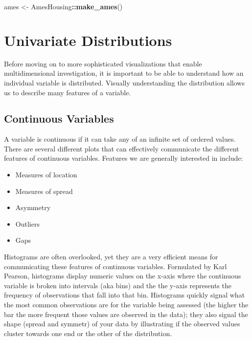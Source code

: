 \documentclass[]{article}
\newenvironment{Shaded}{\begin{snugshade}}{\end{snugshade}}
\newcommand{\KeywordTok}[1]{\textcolor[rgb]{0.13,0.29,0.53}{\textbf{#1}}}
\newcommand{\StringTok}[1]{\textcolor[rgb]{0.31,0.60,0.02}{#1}}
\newcommand{\OperatorTok}[1]{\textcolor[rgb]{0.81,0.36,0.00}{\textbf{#1}}}
\newcommand{\NormalTok}[1]{#1}
\providecommand{\tightlist}{%
  \setlength{\itemsep}{0pt}\setlength{\parskip}{0pt}}
\begin{document}
\begin{Shaded}
\begin{Highlighting}[]
\NormalTok{ames <-}\StringTok{ }\NormalTok{AmesHousing}\OperatorTok{::}\KeywordTok{make_ames}\NormalTok{()}
\end{Highlighting}
\end{Shaded}

\section{Univariate Distributions}\label{univariate-distributions}

Before moving on to more sophisticated visualizations that enable
multidimensional investigation, it is important to be able to understand
how an individual variable is distributed. Visually understanding the
distribution allows us to describe many features of a variable.

\subsection{Continuous Variables}\label{continuous-variables}

A variable is continuous if it can take any of an infinite set of
ordered values. There are several different plots that can effectively
communicate the different features of continuous variables. Features we
are generally interested in include:

\begin{itemize}
\tightlist
\item
  Measures of location
\item
  Measures of spread
\item
  Asymmetry
\item
  Outliers
\item
  Gaps
\end{itemize}

Histograms are often overlooked, yet they are a very efficient means for
communicating these features of continuous variables. Formulated by Karl
Pearson, histograms display numeric values on the x-axis where the
continuous variable is broken into intervals (aka bins) and the the
y-axis represents the frequency of observations that fall into that bin.
Histograms quickly signal what the most common observations are for the
variable being assessed (the higher the bar the more frequent those
values are observed in the data); they also signal the shape (spread and
symmetr) of your data by illustrating if the observed values cluster
towards one end or the other of the distribution.
\end{document}
